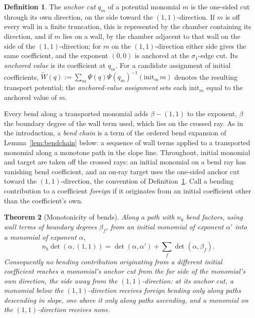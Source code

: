 \documentclass[11pt]{amsart}
\newtheorem{theorem}{Theorem}[section]
\theoremstyle{definition}
\newtheorem{definition}[theorem]{Definition}
\theoremstyle{remark}
\begin{document}
\begin{definition}
\label{def:anchor}
The \emph{anchor cut} $q_m$ of a potential monomial $m$ is the one-sided cut
through its own direction, on the side toward the $(1,1)$-direction. If $m$ is
off every wall in a finite truncation, this is represented by the chamber
containing its direction, and if $m$ lies on a wall, by the chamber adjacent
to that wall on the side of the $(1,1)$-direction; for $m$ on the
$(1,1)$-direction either side gives the
same coefficient, and the exponent $(0,0)$ is anchored at the $\sigma_1$-edge
cut. Its
\emph{anchored value} is its coefficient at $q_m$. For a
candidate assignment of initial coefficients,
$\widetilde W(q):=\sum_{m}\Psi(q)\Psi(q_m)^{-1}(\mathrm{init}_{m}\,m)$ denotes the
resulting transport potential; the \emph{anchored-value assignment} sets each
$\mathrm{init}_m$ equal to the anchored value of $m$.
\end{definition}

Every bend along a transported monomial adds $\beta-(1,1)$ to the exponent,
$\beta$ the boundary degree of the wall term used, which lies on the crossed
ray.  As in the introduction, a \emph{bend chain} is a term of the
ordered bend expansion of Lemma~\ref{lem:bendchain} below: a sequence of wall
terms applied to a transported monomial along a monotone path in the slope
line.  Throughout, initial
monomial and target are taken off the crossed rays: an initial monomial on a
bend ray has vanishing bend coefficient, and an on-ray target uses the one-sided anchor cut toward
the $(1,1)$-direction, the convention of Definition~\ref{def:anchor}. Call a
bending contribution to a coefficient \emph{foreign} if it originates from an
initial coefficient other than the coefficient's own.

\begin{theorem}[Monotonicity of bends]
\label{thm:nobackscatter}
Along a path with $n_b$ bend factors, using wall terms of boundary degrees
$\beta_f$, from an initial monomial of exponent $\alpha'$ into a
monomial of exponent $\alpha$,
\[
n_b\det(\alpha,(1,1))
=\det(\alpha,\alpha')+\sum_{f}\det(\alpha,\beta_{f}).
\]
Consequently no bending contribution originating from a different initial
coefficient reaches a monomial's anchor cut from the far
side of the monomial's own direction, the side away from the
$(1,1)$-direction: at its anchor cut, a monomial below the $(1,1)$-direction
receives foreign bending only along paths descending in slope, one above it
only along paths ascending, and a monomial on the $(1,1)$-direction receives
none.
\end{theorem}
\end{document}
